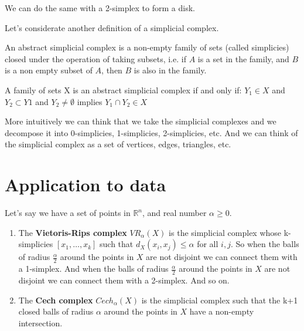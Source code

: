 \documentclass{article}
\begin{document}
We can do the same with a 2-simplex to form a disk.


Let's considerate another definition of a simplicial complex.

\begin{definition}
    An abstract simplicial complex is a non-empty family of sets (called simplicies) closed under the operation of taking subsets, i.e. if $A$ is a set in the family, and $B$ is a non empty subset of $A$, then $B$ is also in the family.

    A family of sets X is an abstract simplicial complex if and only if:
    \(Y_1 \in X \) and \(Y_2 \subset Y1 \) and  \(Y_2 \neq \emptyset \) implies \(Y_1 \cap Y_2 \in X \)
\end{definition}

More intuitively we can think that we take the simplicial complexes and we decompose it into 0-simplicies, 1-simplicies, 2-simplicies, etc. And we can think of the simplicial complex as a set of vertices, edges, triangles, etc.


\section{Application to data}
Let's say we have a set of points in $\mathbb{R}^n$, and real number $\alpha \geq 0$.

\begin{enumerate}
    \item The \textbf{Vietoris-Rips complex} \( VR_\alpha(X) \) is the simplicial complex whose k-simplicies \([x_1,\dots,x_k]\) such that \( d_X(x_i,x_j) \leq \alpha \) for all \( i,j \).
    So when the balls of radius \(\frac\alpha2 \)  around the points in \(X\) are not disjoint we can connect them with a 1-simplex. And when the balls of radius \(\frac\alpha2 \)  around the points in \(X\) are not disjoint we can connect them with a 2-simplex. And so on.

    \item The \textbf{Cech complex} \( Cech_\alpha(X) \) is the simplicial complex such that the k+1 closed balls of radius \(\alpha \) around the points in \(X\) have a non-empty intersection.
\end{enumerate}
\end{document}

